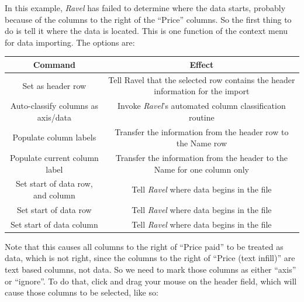 In this example, \emph{Ravel} has failed to determine where the data
starts, probably because of the columns to the right of the ``Price''
columns. So the first thing to do is tell it where the data is located.
This is one function of the context menu for data importing. The options
are:

\begin{tabular}{|c|c|}
\hline 
Command & Effect\tabularnewline
\hline 
\hline 
Set as header row & Tell Ravel that the selected row contains the header information for
the import\tabularnewline
\hline 
Auto-classify columns as axis/data & Invoke \emph{Ravel}'s automated column classification routine\tabularnewline
\hline 
Populate column labels & Transfer the information from the header row to the Name row\tabularnewline
\hline 
Populate current column label & Transfer the information from the header to the Name for one column
only\tabularnewline
\hline 
Set start of data row, and column & Tell \emph{Ravel }where data begins in the file\tabularnewline
\hline 
Set start of data row & Tell \emph{Ravel} where data begins in the file\tabularnewline
\hline 
Set start of data column & Tell \emph{Ravel} where data begins in the file\tabularnewline
\hline 
\end{tabular}
\begin{center}
\par\end{center}

Note that this causes all columns to the right of ``Price paid''
to be treated as data, which is not right, since the columns to the
right of ``Price (text infill)'' are text based columns, not data.
So we need to mark those columns as either ``axis'' or ``ignore''.
To do that, click and drag your mouse on the header field, which will
cause those columns to be selected, like so:
\begin{center}
\par\end{center}

